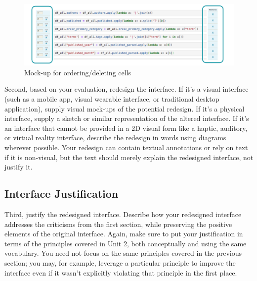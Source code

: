 \documentclass[12pt,letterpaper]{article}
\begin{document}
\begin{figure}[h]
\centering
\includegraphics[scale=.6]{figures/project-principles/cell_create.png}
\caption{Mock-up for ordering/deleting cells}
\label{fig::4}
\end{figure}

Second, based on your evaluation, redesign the interface. If it’s a visual interface (such as a mobile app, visual wearable interface, or traditional desktop application), supply visual mock-ups of the potential redesign. If it’s a physical interface, supply a sketch or similar representation of the altered interface. If it’s an interface that cannot be provided in a 2D visual form like a haptic, auditory, or virtual reality interface, describe the redesign in words using diagrams wherever possible. Your redesign can contain textual annotations or rely on text if it is non-visual, but the text should merely explain the redesigned interface, not justify it.

\subsection*{Interface Justification}
Third, justify the redesigned interface. Describe how your redesigned interface addresses the criticisms from the first section, while preserving the positive elements of the original interface. Again, make sure to put your justification in terms of the principles covered in Unit 2, both conceptually and using the same vocabulary. You need not focus on the same principles covered in the previous section; you may, for example, leverage a particular principle to improve the interface even if it wasn’t explicitly violating that principle in the first place.

 

\end{document}
